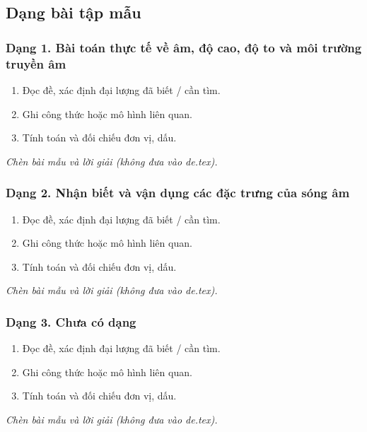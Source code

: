 

\subsection{Dạng bài tập mẫu}
\subsubsection{Dạng 1. Bài toán thực tế về âm, độ cao, độ to và môi trường truyền âm}
\begin{phuongphap}
\begin{enumerate}
\item Đọc đề, xác định đại lượng đã biết / cần tìm.
\item Ghi công thức hoặc mô hình liên quan.
\item Tính toán và đối chiếu đơn vị, dấu.
\end{enumerate}
\end{phuongphap}
\begin{vidumau}
\textit{Chèn bài mẫu và lời giải (không đưa vào de.tex).}
\end{vidumau}

\subsubsection{Dạng 2. Nhận biết và vận dụng các đặc trưng của sóng âm}
\begin{phuongphap}
\begin{enumerate}
\item Đọc đề, xác định đại lượng đã biết / cần tìm.
\item Ghi công thức hoặc mô hình liên quan.
\item Tính toán và đối chiếu đơn vị, dấu.
\end{enumerate}
\end{phuongphap}
\begin{vidumau}
\textit{Chèn bài mẫu và lời giải (không đưa vào de.tex).}
\end{vidumau}

\subsubsection{Dạng 3. Chưa có dạng}
\begin{phuongphap}
\begin{enumerate}
\item Đọc đề, xác định đại lượng đã biết / cần tìm.
\item Ghi công thức hoặc mô hình liên quan.
\item Tính toán và đối chiếu đơn vị, dấu.
\end{enumerate}
\end{phuongphap}
\begin{vidumau}
\textit{Chèn bài mẫu và lời giải (không đưa vào de.tex).}
\end{vidumau}

